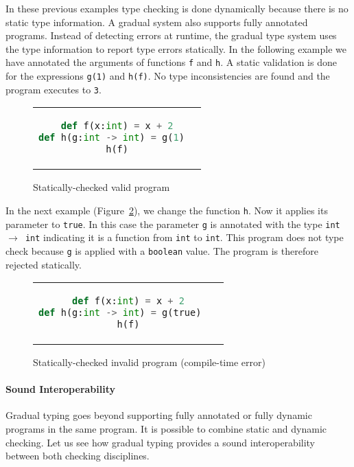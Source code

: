 \documentclass{article}
\newcommand\icode[1]{\texttt{#1}}
\begin{document}
In these previous examples type checking is done dynamically because there is no static type information. A gradual system also supports fully annotated programs. Instead of detecting errors at runtime, the gradual type system uses the type information to report type errors statically. In the following example we have annotated the arguments of functions \icode{f} and \icode{h}. A static validation is done for the expressions \icode{g(1)} and \icode{h(f)}. No type inconsistencies are found and the program executes to \icode{3}.
\begin{figure}[!htbp]
\begin{center}
\begin{tabular}{c}
\begin{lstlisting}[language=Python]
def f(x:int) = x + 2
def h(g:int -> int) = g(1)	
h(f)
\end{lstlisting}
\end{tabular}
\end{center}
\caption{Statically-checked valid program}%
\label{fig:gt-example-3}%
\end{figure} 
 
In the next example (Figure~\ref{fig:gt-example-4}), we change the function \icode{h}. Now it applies its parameter to \icode{true}. In this case the parameter \icode{g} is annotated with the type \icode{int $\rightarrow$ int} indicating it is a function from \icode{int} to \icode{int}. This program does not type check because \icode{g} is applied with a \icode{boolean} value. The program	 is therefore rejected statically.
\begin{figure}[!htbp]
\begin{center}
\begin{tabular}{c}
\begin{lstlisting}[language=Python]
def f(x:int) = x + 2
def h(g:int -> int) = g(true)	
h(f)
\end{lstlisting}
\end{tabular}
\end{center}
\caption{Statically-checked invalid program (compile-time error)}%
\label{fig:gt-example-4}%
\end{figure}  

\paragraph{Sound Interoperability} Gradual typing goes beyond supporting fully annotated or fully dynamic programs in the same program. It is possible to combine static and dynamic checking. Let us see how gradual typing provides a sound interoperability between both checking disciplines.
\end{document}
